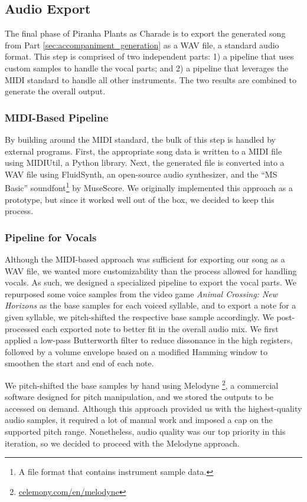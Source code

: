\subsection{Audio Export}
\label{sec:audio_export}

The final phase of Piranha Plants as Charade is to export the generated song from Part \ref{sec:accompaniment_generation} as a WAV file, a standard audio format. This step is comprised of two independent parts: 1) a pipeline that uses custom samples to handle the vocal parts; and 2) a pipeline that leverages the MIDI standard to handle all other instruments. The two results are combined to generate the overall output.

\subsubsection{MIDI-Based Pipeline}

By building around the MIDI standard, the bulk of this step is handled by external programs. First, the appropriate song data is written to a MIDI file using MIDIUtil, a Python library. Next, the generated file is converted into a WAV file using FluidSynth, an open-source audio synthesizer, and the ``MS Basic'' soundfont\footnote{A file format that contains instrument sample data.} by MuseScore. We originally implemented this approach as a prototype, but since it worked well out of the box, we decided to keep this process.

\subsubsection{Pipeline for Vocals}

Although the MIDI-based approach was sufficient for exporting our song as a WAV file, we wanted more customizability than the process allowed for handling vocals. As such, we designed a specialized pipeline to export the vocal parts. We repurposed some voice samples from the video game \emph{Animal Crossing: New Horizons} as the base samples for each voiced syllable, and to export a note for a given syllable, we pitch-shifted the respective base sample accordingly. We post-processed each exported note to better fit in the overall audio mix. We first applied a low-pass Butterworth filter to reduce dissonance in the high registers, followed by a volume envelope based on a modified Hamming window to smoothen the start and end of each note.

We pitch-shifted the base samples by hand using Melodyne \footnote{\href{https://www.celemony.com/en/melodyne}{celemony.com/en/melodyne}}, a commercial software designed for pitch manipulation, and we stored the outputs to be accessed on demand. Although this approach provided us with the highest-quality audio samples, it required a lot of manual work and imposed a cap on the supported pitch range. Nonetheless, audio quality was our top priority in this iteration, so we decided to proceed with the Melodyne approach.
